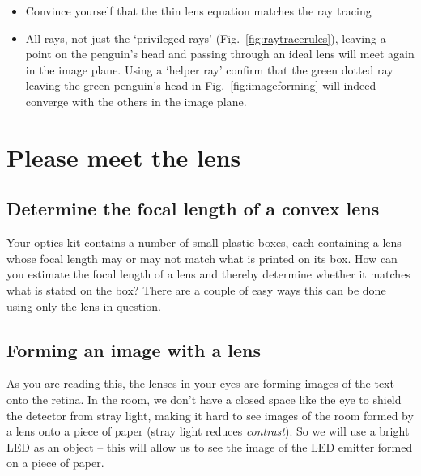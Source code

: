 \documentclass[a4paper]{report}
\begin{document}
	\begin{itemize}
	    \item Convince yourself that the thin lens equation matches the ray tracing
	    \item All rays, not just the `privileged rays' (Fig.~\ref{fig:raytracerules}), leaving a point on the penguin's head and passing through an ideal lens will meet again in the image plane. Using a `helper ray' confirm that the green dotted ray leaving the green penguin's head in Fig.~\ref{fig:imageforming} will indeed converge with the others in the image plane.
	\end{itemize}


    \clearpage

	\section{Please meet the lens}

    \subsection{Determine the focal length of a convex lens}
	\hypertarget{hintBack-focal_length}{}
	Your optics kit contains a number of small plastic boxes, each containing a lens whose focal length may or may not match what is printed on its box.
	How can you estimate the focal length of a lens and thereby determine whether it matches what is stated on the box?
    There are a couple of easy ways this can be done using only the lens in question.



    \subsection{Forming an image with a lens}
	\hypertarget{hintBack-image}{}
	As you are reading this, the lenses in your eyes are forming images of the text onto the retina.
	In the room, we don't have a closed space like the eye to shield the detector from stray light, making it hard to see images of the room formed by a lens onto a piece of paper (stray light reduces \emph{contrast}).
	So we will use a bright LED as an object -- this will allow us to see the image of the LED emitter formed on a piece of paper.
\end{document}
